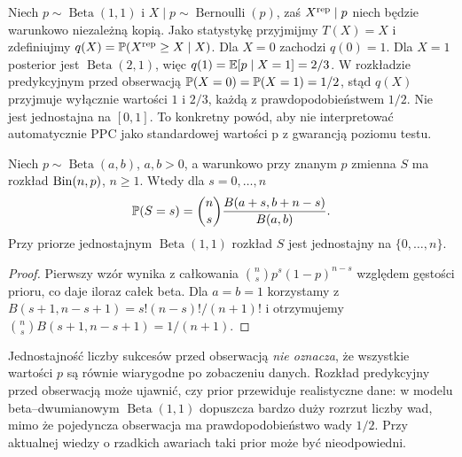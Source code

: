 \begin{przyklad}
Niech $p\sim\operatorname{Beta}(1,1)$ i
$X\mid p\sim\operatorname{Bernoulli}(p)$, zaś
$X^{\rm rep}\mid p$ niech będzie warunkowo niezależną kopią.
Jako statystykę przyjmijmy $T(X)=X$ i zdefiniujmy
$q(X)=\mathbb P(X^{\rm rep}\ge X\mid X)$.
Dla $X=0$ zachodzi $q(0)=1$. Dla $X=1$
posterior jest $\operatorname{Beta}(2,1)$, więc
$q(1)=\mathbb E[p\mid X=1]=2/3$.
W rozkładzie predykcyjnym przed obserwacją
$\mathbb P(X=0)=\mathbb P(X=1)=1/2$, stąd $q(X)$ przyjmuje
wyłącznie wartości $1$ i $2/3$, każdą z prawdopodobieństwem
$1/2$. Nie jest jednostajna na $[0,1]$.
To konkretny powód, aby nie interpretować automatycznie PPC
jako standardowej wartości p z gwarancją poziomu testu.
\end{przyklad}

\begin{stwierdzenie}
\label{prop:prior-predictive-betabinomial}
Niech $p\sim\operatorname{Beta}(a,b)$, $a,b>0$,
a warunkowo przy znanym $p$ zmienna $S$ ma rozkład
$\operatorname{Bin}(n,p)$, $n\ge1$. Wtedy dla $s=0,\ldots,n$
\[
\mathbb P(S=s)=\binom ns\frac{B(a+s,b+n-s)}{B(a,b)}.
\]
Przy priorze jednostajnym $\operatorname{Beta}(1,1)$
rozkład $S$ jest jednostajny na $\{0,\ldots,n\}$.
\end{stwierdzenie}
\begin{proof}
Pierwszy wzór wynika z całkowania
$\binom ns p^s(1-p)^{n-s}$ względem gęstości prioru,
co daje iloraz całek beta. Dla $a=b=1$ korzystamy
z $B(s+1,n-s+1)=s!(n-s)!/(n+1)!$ i otrzymujemy
$\binom ns B(s+1,n-s+1)=1/(n+1)$.
\end{proof}
\begin{uwaga}
Jednostajność liczby sukcesów przed obserwacją \emph{nie oznacza},
że wszystkie wartości $p$ są równie wiarygodne po zobaczeniu danych.
Rozkład predykcyjny przed obserwacją może ujawnić, czy prior
przewiduje realistyczne dane: w modelu beta--dwumianowym
$\operatorname{Beta}(1,1)$ dopuszcza bardzo duży rozrzut liczby
wad, mimo że pojedyncza obserwacja ma prawdopodobieństwo
wady $1/2$. Przy aktualnej wiedzy o rzadkich awariach
taki prior może być nieodpowiedni.
\end{uwaga}

